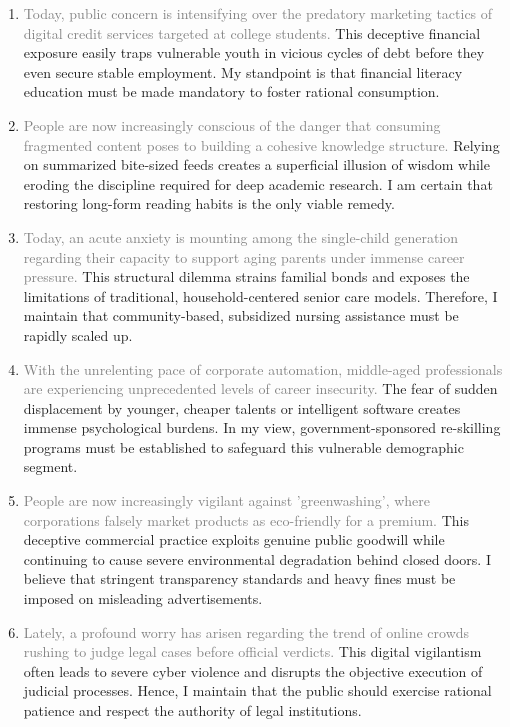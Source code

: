 ﻿\documentclass[lang=cn,11pt]{elegantbook}
\begin{document}
\begin{enumerate}
    \item \textcolor{gray}{Today, public concern is intensifying over the predatory marketing tactics of digital credit services targeted at college students.} This deceptive financial exposure easily traps vulnerable youth in vicious cycles of debt before they even secure stable employment. My standpoint is that financial literacy education must be made mandatory to foster rational consumption.
    \item \textcolor{gray}{People are now increasingly conscious of the danger that consuming fragmented content poses to building a cohesive knowledge structure.} Relying on summarized bite-sized feeds creates a superficial illusion of wisdom while eroding the discipline required for deep academic research. I am certain that restoring long-form reading habits is the only viable remedy.
    \item \textcolor{gray}{Today, an acute anxiety is mounting among the single-child generation regarding their capacity to support aging parents under immense career pressure.} This structural dilemma strains familial bonds and exposes the limitations of traditional, household-centered senior care models. Therefore, I maintain that community-based, subsidized nursing assistance must be rapidly scaled up.
    \item \textcolor{gray}{With the unrelenting pace of corporate automation, middle-aged professionals are experiencing unprecedented levels of career insecurity.} The fear of sudden displacement by younger, cheaper talents or intelligent software creates immense psychological burdens. In my view, government-sponsored re-skilling programs must be established to safeguard this vulnerable demographic segment.
    \item \textcolor{gray}{People are now increasingly vigilant against 'greenwashing', where corporations falsely market products as eco-friendly for a premium.} This deceptive commercial practice exploits genuine public goodwill while continuing to cause severe environmental degradation behind closed doors. I believe that stringent transparency standards and heavy fines must be imposed on misleading advertisements.
    \item \textcolor{gray}{Lately, a profound worry has arisen regarding the trend of online crowds rushing to judge legal cases before official verdicts.} This digital vigilantism often leads to severe cyber violence and disrupts the objective execution of judicial processes. Hence, I maintain that the public should exercise rational patience and respect the authority of legal institutions.

\end{enumerate}
\end{document}
